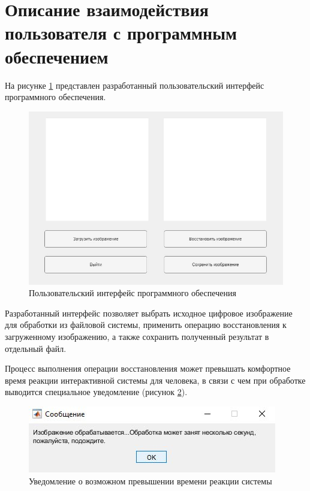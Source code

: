 \clearpage

\section{Описание взаимодействия пользователя с программным обеспечением}

На рисунке \ref{gui} представлен разработанный пользовательский интерфейс программного обеспечения.

\begin{figure}[H]
	\centering
	\includegraphics[scale=0.75]{assets/gui}
	\caption{Пользовательский интерфейс программного обеспечения}
	\label{gui}
\end{figure}

Разработанный интерфейс позволяет выбрать исходное цифровое изображение для обработки из файловой системы, применить операцию восстановления к загруженному изображению, а также сохранить полученный результат в отдельный файл.

Процесс выполнения операции восстановления может превышать комфортное время реакции интерактивной системы для человека, в связи с чем при обработке выводится специальное уведомление (рисунок \ref{wait}).

\begin{figure}[H]
	\centering
	\includegraphics[scale=1]{assets/wait_msg}
	\caption{Уведомление о возможном превышении времени реакции системы}
	\label{wait}
\end{figure}

